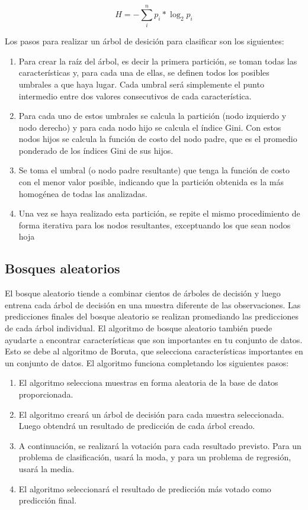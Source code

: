 \documentclass[conference]{IEEEtran}
\begin{document}
\begin{equation}
H=- \sum_{i}^{n}p_i*\log_2p_i
\end{equation}

Los pasos para realizar un árbol de desición para clasificar son los siguientes: 
\begin{enumerate}

\item Para crear la raíz del árbol, es decir la primera partición, se toman todas las características y, para cada una de ellas, se definen todos los posibles umbrales a que haya lugar. Cada umbral será simplemente el punto intermedio entre dos valores consecutivos de cada característica.

\item Para cada uno de estos umbrales se calcula la partición (nodo izquierdo y nodo derecho) y para cada nodo hijo se calcula el índice Gini. Con estos nodos hijos se calcula la función de costo del nodo padre, que es el promedio ponderado de los índices Gini de sus hijos.

\item Se toma el umbral (o nodo padre resultante) que tenga la función de costo con el menor valor posible, indicando que la partición obtenida es la más homogénea de todas las analizadas.

\item Una vez se haya realizado esta partición, se repite el mismo procedimiento de forma iterativa para los nodos resultantes, exceptuando los que sean nodos hoja
\end{enumerate}

\subsection{Bosques aleatorios}
El bosque aleatorio tiende a combinar cientos de árboles de decisión y luego entrena cada árbol de decisión en una muestra diferente de las observaciones. Las predicciones finales del bosque aleatorio se realizan promediando las predicciones de cada árbol individual. El algoritmo de bosque aleatorio también puede ayudarte a encontrar características que son importantes en tu conjunto de datos. Esto se debe al algoritmo de Boruta, que selecciona características importantes en un conjunto de datos. El algoritmo funciona completando los siguientes pasos:
\begin{enumerate}
\item El algoritmo selecciona muestras en forma aleatoria de la base de datos proporcionada.
\item El algoritmo creará un árbol de decisión para cada muestra seleccionada. Luego obtendrá un resultado de predicción de cada árbol creado.
\item A continuación, se realizará la votación para cada resultado previsto. Para un problema de clasificación, usará la moda, y para un problema de regresión, usará la media.
\item El algoritmo seleccionará el resultado de predicción más votado como predicción final.
\end{enumerate}
\end{document}
